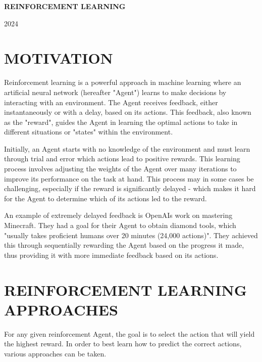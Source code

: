 \documentclass{article}
\begin{document}
\begin{center}
    \textbf{\LARGE REINFORCEMENT LEARNING}

    \vspace{0.2cm}

    2024

\end{center}

\section*{MOTIVATION}

Reinforcement learning is a powerful approach in machine learning where an artificial neural network (hereafter "Agent") learns to make decisions by interacting with an environment. The Agent receives feedback, either instantaneously or with a delay, based on its actions. This feedback, also known as the "reward", guides the Agent in learning the optimal actions to take in different situations or "states" within the environment.

Initially, an Agent starts with no knowledge of the environment and must learn through trial and error which actions lead to positive rewards. This learning process involves adjusting the weights of the Agent over many iterations to improve its performance on the task at hand. This process may in some cases be challenging, especially if the reward is significantly delayed - which makes it hard for the Agent to determine which of its actions led to the reward.

An example of extremely delayed feedback is OpenAIs work on mastering Minecraft. They had a goal for their Agent to obtain diamond tools, which "usually takes proficient humans over 20 minutes (24,000 actions)". They achieved this through sequentially rewarding the Agent based on the progress it made, thus providing it with more immediate feedback based on its actions. \cite{Minecraft}

\section*{REINFORCEMENT LEARNING APPROACHES}

For any given reinforcement Agent, the goal is to select the action that will yield the highest reward. In order to best learn how to predict the correct actions, various approaches can be taken.
\end{document}
